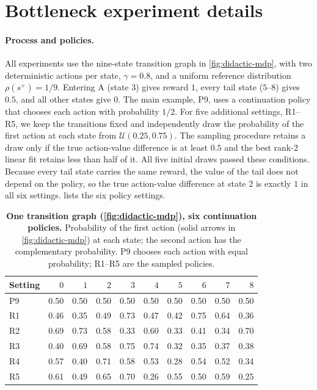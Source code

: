 \section{Bottleneck experiment details}
\label{app:bottleneck-family}

\paragraph{Process and policies.}
\label{app:bottleneck-family-gen}
All experiments use the nine-state transition graph in \cref{fig:didactic-mdp}, with two deterministic actions per state, $\gamma=0.8$, and a uniform reference distribution
$\rho(s^+)=1/9$.
Entering A (state $3$) gives reward $1$, every tail state ($5$--$8$) gives $0.5$, and all other states give $0$.
The main example, P9, uses a continuation policy that chooses each action with probability $1/2$.
For five additional settings, R1--R5, we keep the transitions fixed and independently draw the probability of the first action at each state from $\mathcal U(0.25,0.75)$.
The sampling procedure retains a draw only if the true action-value difference is at least $0.5$ and the best rank-$2$ linear fit retains less than half of it.
All five initial draws passed these conditions.
Because every tail state carries the same reward, the value of the tail does not depend on the policy, so the true action-value difference at state $2$ is exactly $1$ in all six settings.
 lists the six policy settings.

\begin{table}[htb]
    \centering
    \small
    \setlength{\tabcolsep}{4pt}
    \caption{
    \textbf{One transition graph (\cref{fig:didactic-mdp}), six continuation policies.}
    Probability of the first action (solid arrows in \cref{fig:didactic-mdp}) at each state; the second action has the complementary probability.
    P9 chooses each action with equal probability; R1--R5 are the sampled policies.
    }
    \label{fig:family-graphs}
    \begin{tabular}{lrrrrrrrrr}
        \toprule
        Setting & $0$ & $1$ & $2$ & $3$ & $4$ & $5$ & $6$ & $7$ & $8$ \\
        \midrule
        P9 & 0.50 & 0.50 & 0.50 & 0.50 & 0.50 & 0.50 & 0.50 & 0.50 & 0.50 \\
        R1 & 0.46 & 0.35 & 0.49 & 0.73 & 0.47 & 0.42 & 0.75 & 0.64 & 0.36 \\
        R2 & 0.69 & 0.73 & 0.58 & 0.33 & 0.60 & 0.33 & 0.41 & 0.34 & 0.70 \\
        R3 & 0.40 & 0.69 & 0.58 & 0.75 & 0.74 & 0.32 & 0.35 & 0.37 & 0.38 \\
        R4 & 0.57 & 0.40 & 0.71 & 0.58 & 0.53 & 0.28 & 0.54 & 0.52 & 0.34 \\
        R5 & 0.61 & 0.49 & 0.65 & 0.70 & 0.26 & 0.55 & 0.50 & 0.59 & 0.25 \\
        \bottomrule
    \end{tabular}
\end{table}

